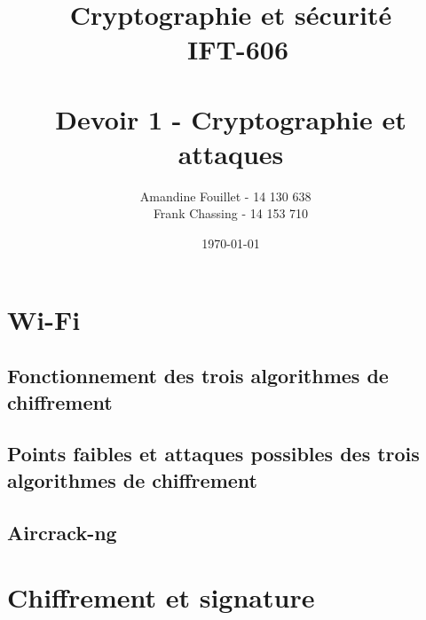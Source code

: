 \documentclass[11pt]{article}
\title{\vspace{\fill} Cryptographie et sécurité \\ ~\textbf{IFT-606} \\~\\ Devoir 1 - Cryptographie et attaques}
\author{Amandine Fouillet - 14 130 638 ~\\ Frank Chassing - 14 153 710}
\date{\today \vspace{\fill}}
\begin{document}
\maketitle
\newpage \thispagestyle{empty}
\null
\newpage
\tableofcontents
\listoffigures
\newpage
\section{Wi-Fi}
\subsection{Fonctionnement des trois algorithmes de chiffrement}
\subsection{Points faibles et attaques possibles des trois algorithmes de chiffrement}
\subsection{Aircrack-ng}
\section{Chiffrement et signature}
\end{document}
